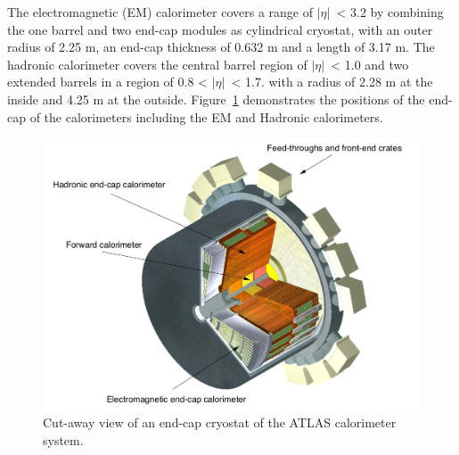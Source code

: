 \documentclass[UTF8,12pt]{ctexart}
\numberwithin{equation}{section}
\def\abseta{$|$$\eta$$|$~}
\begin{document}
The electromagnetic (EM) calorimeter covers a range of  \abseta < 3.2 by combining the one barrel and two end-cap modules as cylindrical cryostat, with an outer radius of 2.25 m, an end-cap thickness of 0.632 m and a length of 3.17 m. The hadronic calorimeter covers the central barrel region of \abseta < 1.0 and two extended barrels in a region of 0.8 < \abseta < 1.7. with a radius of 2.28 m at the inside and 4.25 m at the outside. Figure~\ref{Fig.calo2} demonstrates the positions of the end-cap of the calorimeters including the EM and Hadronic calorimeters.



\begin{figure}[htb] 
	\centering  
	\includegraphics[width=15cm]{./fig/calo2.png}	\caption{Cut-away view of an end-cap cryostat of the ATLAS calorimeter system.}
	\label{Fig.calo2}
\end{figure}
\end{document}
